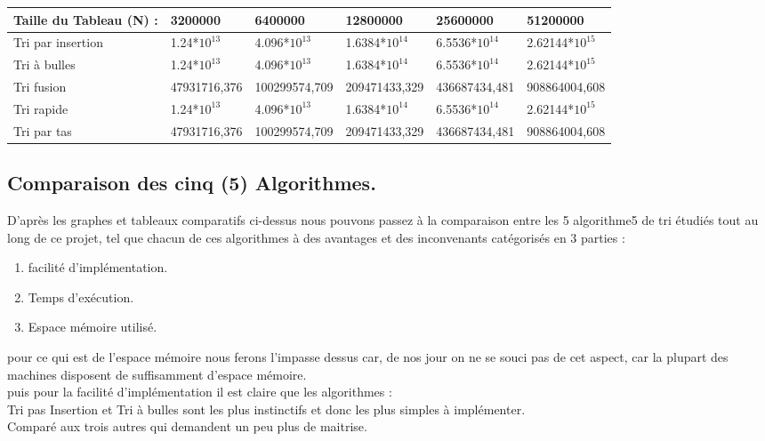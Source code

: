 \documentclass[12pt]{article}
\begin{document}
\begin{tabular}{|p{3cm}||p{2.5cm}|p{2.5cm}|p{2.5cm}|p{2.5cm}|p{2.5cm}|}
\hline
Taille du Tableau (N) : & 3200000 & 6400000 & 12800000 & 25600000 &  51200000  \\
\hline
Tri par insertion  & 1.24*$10^{13}$ & 4.096*$10^{13}$ & 1.6384*$10^{14}$ & 6.5536*$10^{14}$ & 2.62144*$10^{15}$    \\
\hline
Tri à bulles & 1.24*$10^{13}$ & 4.096*$10^{13}$ & 1.6384*$10^{14}$ & 6.5536*$10^{14}$ & 2.62144*$10^{15}$    \\
\hline
Tri fusion  & 47931716,376 & 100299574,709 & 209471433,329 & 436687434,481 & 908864004,608 \\
\hline
Tri rapide & 1.24*$10^{13}$ & 4.096*$10^{13}$ & 1.6384*$10^{14}$ & 6.5536*$10^{14}$ & 2.62144*$10^{15}$    \\
\hline
Tri par tas & 47931716,376 & 100299574,709 & 209471433,329 & 436687434,481 & 908864004,608 \\
\hline
\end{tabular}


\subsection{Comparaison des cinq (5) Algorithmes.}

D'après les graphes et tableaux comparatifs ci-dessus nous pouvons passez à la comparaison entre les 5 algorithme5 de tri étudiés tout au long de ce projet, tel que chacun de ces algorithmes à des avantages et des inconvenants catégorisés en 3 parties : \\
\begin{enumerate}
	\item facilité d'implémentation.
	\item Temps d'exécution.
	\item Espace mémoire utilisé.\\
\end{enumerate} 
 pour ce qui est de l'espace mémoire nous ferons l'impasse dessus car, de nos jour on ne se souci pas de cet aspect, car la plupart des machines disposent de suffisamment d'espace mémoire.\\
 
 
puis pour la facilité d'implémentation il est claire que les algorithmes : \\
Tri pas Insertion et Tri à bulles  sont les plus instinctifs et donc les plus simples à implémenter.\\
Comparé aux trois autres qui demandent un peu plus de maitrise.\\
\end{document}
